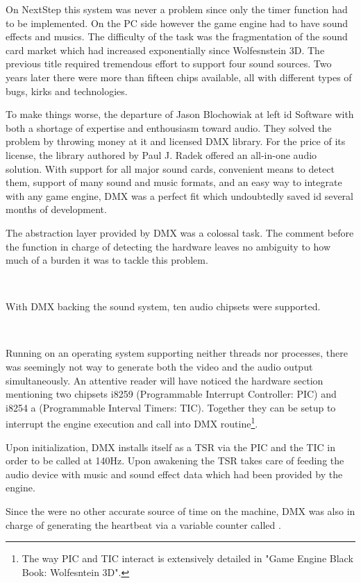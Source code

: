 On NextStep this system was never a problem since only the timer function had to be implemented. On the PC side however the game engine had to have sound effects and musics. The difficulty of the task was the fragmentation of the sound card market which had increased exponentially since Wolfesnstein 3D. The previous title required tremendous effort to support four sound sources. Two years later there were more than fifteen chips available, all with different types of bugs, kirks and technologies.\\
\par
To make things worse, the departure of Jason Blochowiak  at left id Software with both a shortage of expertise and enthousiasm toward audio. They solved the problem by throwing money at it and licensed DMX library. For the price of its license, the library authored by Paul J. Radek offered an all-in-one audio solution. With support for all major sound cards, convenient means to detect them, support of many sound and music formats, and an easy way to integrate with any game engine, DMX was a perfect fit which undoubtedly saved id several months of development.





The abstraction layer provided by DMX was a colossal task. The comment before the function in charge of detecting the hardware leaves no ambiguity to how much of a burden it was to tackle this problem.\\
\par
{}\\
\par
With DMX backing the sound system, ten audio chipsets were supported.\\
\par
{}\\
\par
Running on an operating system supporting neither threads nor processes, there was seemingly not way to generate both the video and the audio output simultaneously. An attentive reader will have noticed the hardware section mentioning two chipsets i8259 (Programmable Interrupt Controller: PIC) and i8254 a (Programmable Interval Timers: TIC). Together they can be setup to interrupt the engine execution and call into DMX routine\footnote{The way PIC and TIC interact is extensively detailed in "Game Engine Black Book: Wolfesntein 3D".}.\\
\par
Upon initialization, DMX installs itself as a TSR via the PIC and the TIC in order to be called at 140Hz. Upon awakening the TSR takes care of feeding the audio device with music and sound effect data which had been provided by the engine.\\
\par
 Since the were no other accurate source of time on the machine, DMX was also in charge of generating the heartbeat via a variable counter called .
\par


